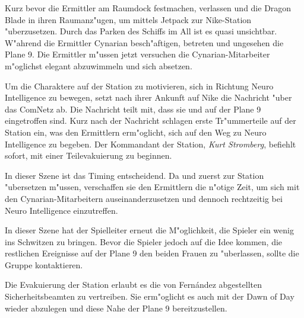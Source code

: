 Kurz bevor die Ermittler am Raumdock festmachen, verlassen \xl{} und \ml{} die Dragon Blade in ihren Raumanz"ugen, um mittels Jetpack zur Nike-Station "uberzusetzen. Durch das Parken des Schiffs im All ist es quasi unsichtbar. W"ahrend die Ermittler Cynarian besch"aftigen, betreten \xl{} und \ml{} ungesehen die Plane 9. Die Ermittler m"ussen jetzt versuchen die Cynarian-Mitarbeiter m"oglichst elegant abzuwimmeln und sich absetzen.

Um die Charaktere auf der Station zu motivieren, sich in Richtung Neuro Intelligence zu bewegen, setzt \ml{} nach ihrer Ankunft auf Nike die Nachricht  "uber das ComNetz ab. Die Nachricht teilt mit, dass sie und \xl{} auf der Plane 9 eingetroffen sind. Kurz nach der Nachricht schlagen erste Tr"ummerteile auf der Station ein, was den Ermittlern erm"oglicht, sich auf den Weg zu Neuro Intelligence zu begeben. Der Kommandant der Station, \emph{Kurt Stromberg}, befiehlt sofort, mit einer Teilevakuierung zu beginnen.

\begin{remarks}
	In dieser Szene ist das Timing entscheidend. Da \xl{} und \ml{} zuerst zur Station "ubersetzen m"ussen, verschaffen sie den Ermittlern die n"otige Zeit, um sich mit den Cynarian-Mitarbeitern auseinanderzusetzen und dennoch rechtzeitig bei Neuro Intelligence einzutreffen.
	
	In dieser Szene hat der Spielleiter erneut die M"oglichkeit, die Spieler ein wenig ins Schwitzen zu bringen. Bevor die Spieler jedoch auf die Idee kommen, die restlichen Ereignisse auf der Plane 9 den beiden Frauen zu "uberlassen, sollte \ml{} die Gruppe kontaktieren.

	Die Evakuierung der Station erlaubt es die von Fern\'andez abgestellten Sicherheitsbeamten zu vertreiben. Sie erm"oglicht es auch mit der Dawn of Day wieder abzulegen und diese Nahe der Plane 9 bereitzustellen.	
\end{remarks}
